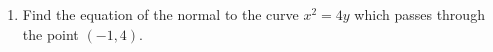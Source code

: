 
\begin{enumerate}

\item Find the equation of the normal to the curve ${x}^2 = 4y$ which passes through the point $(-1, 4).$       
\end{enumerate}
